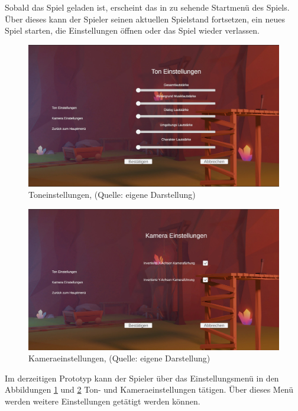 Sobald das Spiel geladen ist, erscheint das in  zu sehende Startmenü des Spiels. Über dieses kann der Spieler seinen aktuellen Spielstand fortsetzen, ein neues Spiel starten, die Einstellungen öffnen oder das Spiel wieder verlassen.
\newpage
\begin{figure}[ht]
\centering
\includegraphics[width=1\linewidth]{content/pictures/SoundSetting.jpg}
\caption{Toneinstellungen, (Quelle: eigene Darstellung)}
\label{fig:sound_settings}
\end{figure}

\begin{figure}[ht]
\centering
\includegraphics[width=1\linewidth]{content/pictures/CamSetting.jpg}
\caption{Kameraeinstellungen, (Quelle: eigene Darstellung)}
\label{fig:cam_settings}
\end{figure}

Im derzeitigen Prototyp kann der Spieler über das Einstellungsmenü in den Abbildungen \ref{fig:sound_settings} und \ref{fig:cam_settings} Ton- und Kameraeinstellungen tätigen. Über dieses Menü werden weitere Einstellungen getätigt werden können.
\newpage
